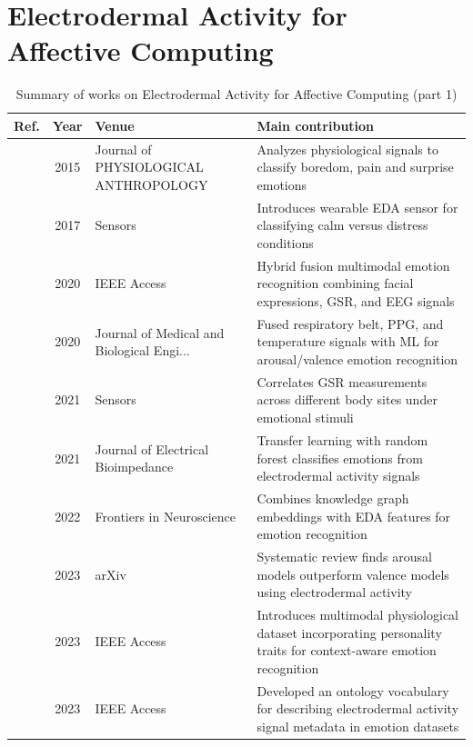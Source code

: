 \section{Electrodermal Activity for Affective Computing}\label{sec:theme2}
\begin{table}[!t]
\centering
\renewcommand{\arraystretch}{1.2}
\caption{Summary of works on Electrodermal Activity for Affective Computing (part 1)}\label{tab:theme2}
\begin{tabularx}{\textwidth}{@{}l c p{3.6cm} X@{}}
\toprule
\textbf{Ref.} & \textbf{Year} & \textbf{Venue} & \textbf{Main contribution} \\
\midrule
\cite{jang2015analysis} & 2015 & Journal of PHYSIOLOGICAL ANTHROPOLOGY & Analyzes physiological signals to classify boredom, pain and surprise emotions \\
\cite{zangroniz2017electrodermal} & 2017 & Sensors & Introduces wearable EDA sensor for classifying calm versus distress conditions \\
\cite{cimtay2020cross} & 2020 & IEEE Access & Hybrid fusion multimodal emotion recognition combining facial expressions, GSR, and EEG signals \\
\cite{ayata2020emotion} & 2020 & Journal of Medical and Biological Engi... & Fused respiratory belt, PPG, and temperature signals with ML for arousal/valence emotion recognition \\
\cite{sanchezcomas2021correlation} & 2021 & Sensors & Correlates GSR measurements across different body sites under emotional stimuli \\
\cite{jacobsen2021classification} & 2021 & Journal of Electrical Bioimpedance & Transfer learning with random forest classifies emotions from electrodermal activity signals \\
\cite{fordson2022emotion} & 2022 & Frontiers in Neuroscience & Combines knowledge graph embeddings with EDA features for emotion recognition \\
\cite{damelio2023exploring} & 2023 & arXiv & Systematic review finds arousal models outperform valence models using electrodermal activity \\
\cite{pant2023phymer} & 2023 & IEEE Access & Introduces multimodal physiological dataset incorporating personality traits for context-aware emotion recognition \\
\cite{zawadzka2023ontological} & 2023 & IEEE Access & Developed an ontology vocabulary for describing electrodermal activity signal metadata in emotion datasets \\

\end{tabularx}
\end{table}
